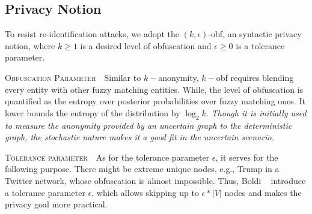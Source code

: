 \subsection{Privacy Notion}
\label{sec:privacyNotion}
To resist re-identification attacks, we adopt the $(k,\epsilon)$-obf, an syntactic privacy notion,
 where $k \ge 1$ is a desired level of obfuscation  and $\epsilon \ge 0$ is a tolerance parameter. 

\textsc{Obfuscation Parameter}~~Similar to $k-$anonymity, $k-$obf requires blending every entity with other fuzzy matching entities. While, the level of obfuscation is quantified as the entropy over posterior probabilities over fuzzy matching ones. It lower bounds the entropy of the distribution by $\log_{2} k$. 
\emph{Though it is initially used to measure the anonymity provided by an uncertain graph to the deterministic graph, the stochastic nature makes it a good fit in the uncertain scenario.} 

\textsc{Tolerance parameter}~~As for the tolerance parameter $\epsilon$, it serves for the following purpose. There might be extreme unique nodes, e.g., Trump in a Twitter network, whose obfuscation is almost impossible. Thus, Boldi {\etal}~\cite{Boldi_Injecting_2012} introduce a tolerance parameter $\epsilon$, which allows skipping up to $\epsilon * |V|$ nodes and makes the privacy goal more practical. 

\vspace{-12pt}
